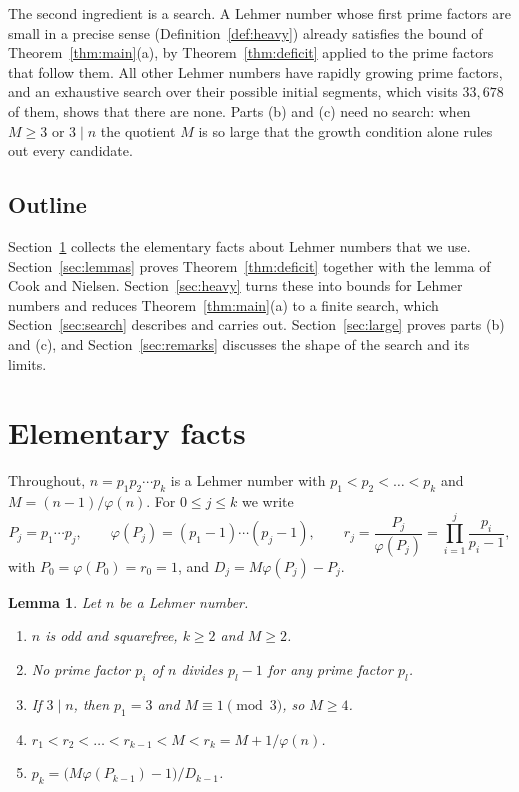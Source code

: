 \documentclass[11pt,reqno]{amsart}
\numberwithin{equation}{section}
\theoremstyle{plain}
\newtheorem{lemma}[theorem]{Lemma}
\theoremstyle{definition}
\theoremstyle{remark}
\begin{document}
The second ingredient is a search. A Lehmer number whose first prime
factors are small in a precise sense (Definition~\ref{def:heavy})
already satisfies the bound of Theorem~\ref{thm:main}(a), by
Theorem~\ref{thm:deficit} applied to the prime factors that follow
them. All other Lehmer numbers have rapidly growing prime factors, and
an exhaustive search over their possible initial segments, which
visits $33{,}678$ of them, shows that there are none. Parts (b) and
(c) need no search: when $M\ge3$ or $3\mid n$ the quotient $M$ is so
large that the growth condition alone rules out every candidate.

\subsection{Outline}
Section~\ref{sec:facts} collects the elementary facts about Lehmer
numbers that we use. Section~\ref{sec:lemmas} proves
Theorem~\ref{thm:deficit} together with the lemma of Cook and Nielsen.
Section~\ref{sec:heavy} turns these into bounds for Lehmer numbers and
reduces Theorem~\ref{thm:main}(a) to a finite search, which
Section~\ref{sec:search} describes and carries out.
Section~\ref{sec:large} proves parts (b) and (c), and
Section~\ref{sec:remarks} discusses the shape of the search and its
limits.

\section{Elementary facts}\label{sec:facts}

Throughout, $n=p_1p_2\cdots p_k$ is a Lehmer number with
$p_1<p_2<\dots<p_k$ and $M=(n-1)/\varphi(n)$. For $0\le j\le k$ we
write
\[
  P_j=p_1\cdots p_j,\qquad
  \varphi(P_j)=(p_1-1)\cdots(p_j-1),\qquad
  r_j=\frac{P_j}{\varphi(P_j)}=\prod_{i=1}^{j}\frac{p_i}{p_i-1},
\]
with $P_0=\varphi(P_0)=r_0=1$, and $D_j=M\varphi(P_j)-P_j$.

\begin{lemma}\label{lem:facts}
Let $n$ be a Lehmer number.
\begin{enumerate}[label=\textup{(\alph*)}]
\item $n$ is odd and squarefree, $k\ge2$ and $M\ge2$.
\item No prime factor $p_i$ of $n$ divides $p_l-1$ for any prime factor
$p_l$.
\item If $3\mid n$, then $p_1=3$ and $M\equiv1\pmod3$, so $M\ge4$.
\item $r_1<r_2<\dots<r_{k-1}<M<r_k=M+1/\varphi(n)$.
\item $p_k=\bigl(M\varphi(P_{k-1})-1\bigr)/D_{k-1}$.
\end{enumerate}
\end{lemma}
\end{document}
